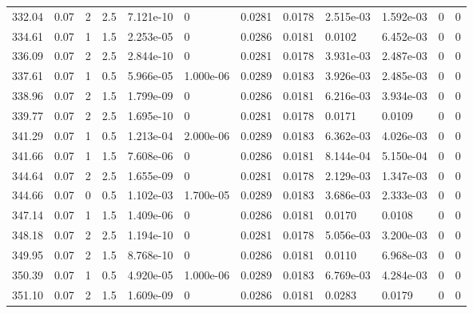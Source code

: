 \documentclass[preview]{standalone}
\begin{document}
{{{{{\begin{tabular}{L{1.2cm}C{1.2cm} C{0.3cm}C{0.5cm} C{1.4cm}C{1.4cm} C{1.4cm}C{1.4cm} C{1.6cm}C{1.6cm} C{1.6cm}C{1.6cm}}
  332.04  &  0.07  & 2     & 2.5 &  7.121e-10  & 0  &  0.0281&   0.0178& 2.515e-03 & 1.592e-03   &  0 & 0  \\ 
  334.61  &  0.07  & 1     & 1.5 &  2.253e-05  & 0  &  0.0286&   0.0181& 0.0102 & 6.452e-03   &  0 & 0  \\ 
  336.09  &  0.07  & 2     & 2.5 &  2.844e-10  & 0  &  0.0281&   0.0178& 3.931e-03 & 2.487e-03   &  0 & 0  \\ 
  337.61  &  0.07  & 1     & 0.5 &  5.966e-05  & 1.000e-06  &  0.0289&   0.0183& 3.926e-03 & 2.485e-03   &  0 & 0  \\ 
  338.96  &  0.07  & 2     & 1.5 &  1.799e-09  & 0  &  0.0286&   0.0181& 6.216e-03 & 3.934e-03   &  0 & 0  \\ 
  339.77  &  0.07  & 2     & 2.5 &  1.695e-10  & 0  &  0.0281&   0.0178& 0.0171 & 0.0109   &  0 & 0  \\ 
  341.29  &  0.07  & 1     & 0.5 &  1.213e-04  & 2.000e-06  &  0.0289&   0.0183& 6.362e-03 & 4.026e-03   &  0 & 0  \\ 
  341.66  &  0.07  & 1     & 1.5 &  7.608e-06  & 0  &  0.0286&   0.0181& 8.144e-04 & 5.150e-04   &  0 & 0  \\ 
  344.64  &  0.07  & 2     & 2.5 &  1.655e-09  & 0  &  0.0281&   0.0178& 2.129e-03 & 1.347e-03   &  0 & 0  \\ 
  344.66  &  0.07  & 0     & 0.5 &  1.102e-03  & 1.700e-05  &  0.0289&   0.0183& 3.686e-03 & 2.333e-03   &  0 & 0  \\ 
  347.14  &  0.07  & 1     & 1.5 &  1.409e-06  & 0  &  0.0286&   0.0181& 0.0170 & 0.0108   &  0 & 0  \\ 
  348.18  &  0.07  & 2     & 2.5 &  1.194e-10  & 0  &  0.0281&   0.0178& 5.056e-03 & 3.200e-03   &  0 & 0  \\ 
  349.95  &  0.07  & 2     & 1.5 &  8.768e-10  & 0  &  0.0286&   0.0181& 0.0110 & 6.968e-03   &  0 & 0  \\ 
  350.39  &  0.07  & 1     & 0.5 &  4.920e-05  & 1.000e-06  &  0.0289&   0.0183& 6.769e-03 & 4.284e-03   &  0 & 0  \\ 
  351.10  &  0.07  & 2     & 1.5 &  1.609e-09  & 0  &  0.0286&   0.0181& 0.0283 & 0.0179   &  0 & 0  \\ 
\hline 
\end{tabular} 

}}}}}
\end{document}
